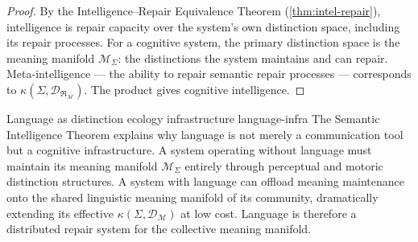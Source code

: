 \documentclass[12pt,twoside,openright]{book}
\newcommand{\repair}{\mathfrak{R}}
\begin{document}
\begin{proof}
  By the Intelligence--Repair Equivalence Theorem
  (\cref{thm:intel-repair}), intelligence is repair
  capacity over the system's own distinction space,
  including its repair processes.
  For a cognitive system, the primary distinction space
  is the meaning manifold $\mathcal{M}_\Sigma$:
  the distinctions the system maintains and can repair.
  Meta-intelligence — the ability to repair semantic
  repair processes — corresponds to
  $\kappa(\Sigma, \mathcal{D}_{\repair_\mathcal{M}})$.
  The product gives cognitive intelligence.
\end{proof}

\begin{remark}{Language as distinction ecology infrastructure}%
  {language-infra}
  The Semantic Intelligence Theorem explains why language
  is not merely a communication tool but a cognitive
  infrastructure.
  A system operating without language must maintain its
  meaning manifold $\mathcal{M}_\Sigma$ entirely through
  perceptual and motoric distinction structures.
  A system with language can offload meaning maintenance
  onto the shared linguistic meaning manifold of its
  community, dramatically extending its effective
  $\kappa(\Sigma, \mathcal{D}_\mathcal{M})$ at low cost.
  Language is therefore a distributed repair system for
  the collective meaning manifold.
\end{remark}
\end{document}
